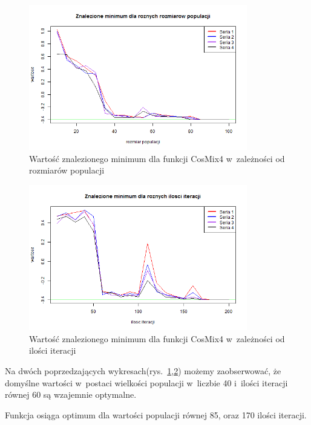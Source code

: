 \documentclass[11pt, a4paper]{article}
\newcommand{\fbi}{\leavevmode{\parindent=1em\indent}}
\begin{document}
\begin{figure}[H]
	\begin{center}
		\includegraphics[width=0.85\textwidth]{./assets/CosMix44.png}
		\caption{Wartość znalezionego minimum dla funkcji CosMix4 w~zależności od rozmiarów populacji}
		\label{fig:cosmix44}
	\end{center}
\end{figure}

\begin{figure}[H]
	\begin{center}
		\includegraphics[width=0.85\textwidth]{./assets/CosMix45.png}
		\caption{Wartość znalezionego minimum dla funkcji CosMix4 w~zależności od ilości iteracji}
		\label{fig:cosmix45}
	\end{center}
\end{figure}

\fbi
Na dwóch poprzedzających wykresach(rys.~\ref{fig:cosmix44},\ref{fig:cosmix45}) możemy zaobserwować, że domyślne wartości w~postaci wielkości populacji w~liczbie 40 i~ilości iteracji równej 60 są wzajemnie optymalne.

\fbi
Funkcja osiąga optimum dla wartości populacji równej 85, oraz 170 ilości iteracji.
\end{document}
